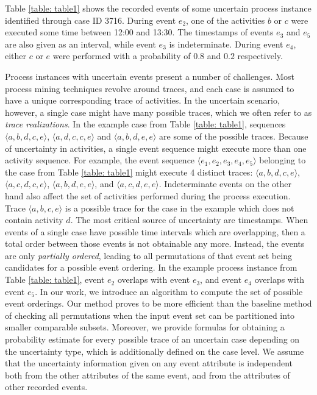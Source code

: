 Table \ref{table: table1} shows the recorded events of some uncertain process instance identified through case ID 3716.
During event $e_2$, one of the activities $b$ or $c$ were executed some time between 12:00 and 13:30.
The timestamps of events $e_3$ and $e_5$ are also given as an interval, while event $e_3$ is indeterminate.
During event $e_4$, either $c$ or $e$ were performed with a probability of $0.8$ and $0.2$ respectively.

Process instances with uncertain events present a number of challenges.
Most process mining techniques revolve around traces, and each case is assumed to have a unique corresponding trace of activities.
In the uncertain scenario, however, a single case might have many possible traces, which we often refer to as \textit{trace realizations}.
In the example case from Table \ref{table: table1}, sequences $\langle a,b,d,c,e\rangle$, $\langle a,d,c,c,e\rangle$ and $\langle a,b,d,e,e\rangle$ are some of the possible traces.
Because of uncertainty in activities, a single event sequence might execute more than one activity sequence.
For example, the event sequence $\langle e_1,e_2,e_3,e_4,e_5 \rangle$ belonging to the case from Table \ref{table: table1} might execute 4 distinct traces: $\langle a,b,d,c,e \rangle$, $\langle a,c,d,c,e \rangle$, $\langle a,b,d,e,e \rangle$, and $\langle a,c,d,e,e\rangle$.
Indeterminate events on the other hand also affect the set of activities performed during the process execution.
Trace $\langle a,b,c,e \rangle$ is a possible trace for the case in the example which does not contain activity $d$.
The most critical source of uncertainty are timestamps.
When events of a single case have possible time intervals which are overlapping, then a total order between those events is not obtainable any more.
Instead, the events are only \textit{partially ordered}, leading to all permutations of that event set being candidates for a possible event ordering.
In the example process instance from Table \ref{table: table1}, event $e_2$ overlaps with event $e_3$, and event $e_4$ overlaps with event $e_5$.
In our work, we introduce an algorithm to compute the set of possible event orderings.
Our method proves to be more efficient than the baseline method of checking all permutations when the input event set can be partitioned into smaller comparable subsets.
Moreover, we provide formulas for obtaining a probability estimate for every possible trace of an uncertain case depending on the uncertainty type, which is additionally defined on the case level.
We assume that the uncertainty information given on any event attribute is independent both from the other attributes of the same event, and from the attributes of other recorded events.
